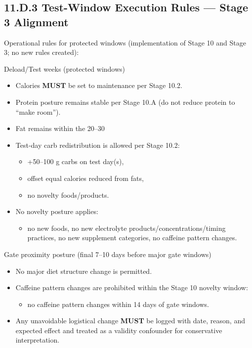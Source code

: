 \documentclass[10pt]{article}
\begin{document}
\newpage

\subsection*{11.D.3 Test-Window Execution Rules — Stage 3 Alignment}
{}

Operational rules for protected windows (implementation of Stage 10 and Stage 3; no new rules created):

Deload/Test weeks (protected windows)

\begin{itemize}
\item Calories \textbf{MUST} be set to maintenance per Stage 10.2.
\item Protein posture remains stable per Stage 10.A (do not reduce protein to “make room”).
\item Fat remains within the 20–30%
\item Test-day carb redistribution is allowed per Stage 10.2:
\begin{itemize}
\item +50–100 g carbs on test day(s),
\item offset equal calories reduced from fats,
\item no novelty foods/products.
\end{itemize}
\item No novelty posture applies:
\begin{itemize}
\item no new foods, no new electrolyte products/concentrations/timing practices, no new supplement categories, no caffeine pattern changes.
\end{itemize}
\end{itemize}

Gate proximity posture (final 7–10 days before major gate windows)

\begin{itemize}
\item No major diet structure change is permitted.
\item Caffeine pattern changes are prohibited within the Stage 10 novelty window:
\begin{itemize}
\item no caffeine pattern changes within 14 days of gate windows.
\end{itemize}
\item Any unavoidable logistical change \textbf{MUST} be logged with date, reason, and expected effect and treated as a validity confounder for conservative interpretation.
\end{itemize}
\end{document}
